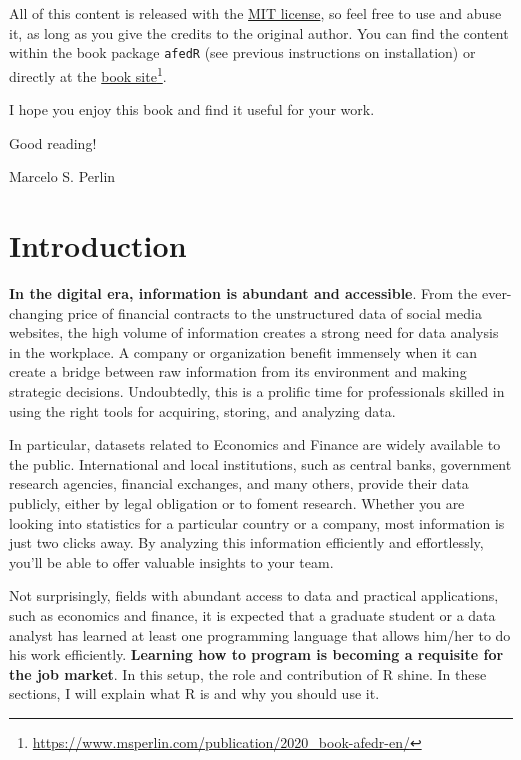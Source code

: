 \documentclass[
  12pt,
]{book}
\begin{document}
All of this content is released with the \href{https://opensource.org/licenses/MIT}{MIT license}, so feel free to use and abuse it, as long as you give the credits to the original author. You can find the content within the book package \texttt{afedR} (see previous instructions on installation) or directly at the \href{https://www.msperlin.com/publication/2020_book-afedr-en/}{book site}\footnote{\url{https://www.msperlin.com/publication/2020_book-afedr-en/}}.

I hope you enjoy this book and find it useful for your work.

Good reading!

Marcelo S. Perlin

\hypertarget{introduction}{%
\chapter{Introduction}\label{introduction}}

\textbf{In the digital era, information is abundant and accessible}. From the ever-changing price of financial contracts to the unstructured data of social media websites, the high volume of information creates a strong need for data analysis in the workplace. A company or organization benefit immensely when it can create a bridge between raw information from its environment and making strategic decisions. Undoubtedly, this is a prolific time for professionals skilled in using the right tools for acquiring, storing, and analyzing data.

In particular, datasets related to Economics and Finance are widely available to the public. International and local institutions, such as central banks, government research agencies, financial exchanges, and many others, provide their data publicly, either by legal obligation or to foment research. Whether you are looking into statistics for a particular country or a company, most information is just two clicks away. By analyzing this information efficiently and effortlessly, you'll be able to offer valuable insights to your team.

Not surprisingly, fields with abundant access to data and practical applications, such as economics and finance, it is expected that a graduate student or a data analyst has learned at least one programming language that allows him/her to do his work efficiently. \textbf{Learning how to program is becoming a requisite for the job market}. In this setup, the role and contribution of R shine. In these sections, I will explain what R is and why you should use it.
\end{document}
